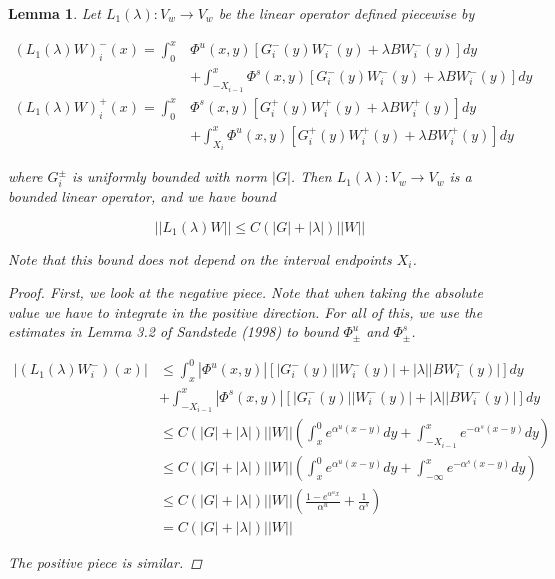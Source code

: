 \documentclass[12pt]{article}
\newtheorem{lemma}{Lemma}
\begin{document}
\begin{lemma}

Let $L_1(\lambda): V_w \rightarrow V_w$ be the linear operator defined piecewise by

\begin{align*}
(L_1(\lambda)W)_i^-(x) = \int_0^x &\Phi^u(x, y)[G_i^-(y) W_i^-(y) + \lambda B W_i^-(y) ] dy \\
&+ \int_{-X_{i-1}}^x \Phi^s(x, y)[G_i^-(y) W_i^-(y) + \lambda B W_i^-(y) ] dy \\
(L_1(\lambda)W)_i^+(x) = \int_0^x &\Phi^s(x, y)[G_i^+(y) W_i^+(y) + \lambda B W_i^+(y)] dy \\
&+ \int_{X_{i}}^x \Phi^u(x, y)[G_i^+(y) W_i^+(y) + \lambda B W_i^+(y) ] dy
\end{align*}

where $G_i^\pm$ is uniformly bounded with norm $|G|$. Then $L_1(\lambda): V_w \rightarrow V_w$ is a bounded linear operator, and we have bound

\begin{equation}
||L_1(\lambda)W|| \leq C\left(|G| +|\lambda|\right)||W||
\end{equation}

Note that this bound does not depend on the interval endpoints $X_i$.

\begin{proof}
First, we look at the negative piece. Note that when taking the absolute value we have to integrate in the positive direction. For all of this, we use the estimates in Lemma 3.2 of Sandstede (1998) to bound $\Phi^u_\pm$ and $\Phi^s_\pm$.

\begin{align*}
|(L_1(\lambda)W_i^-)(x) | &\leq \int_x^0 |\Phi^u(x, y)|[|G_i^-(y)||W_i^-(y)| + |\lambda||B W_i^-(y)| ] dy \\
&+ \int_{-X_{i-1}}^x |\Phi^s(x, y)|[|G_i^-(y)||W_i^-(y)| + |\lambda||B W_i^-(y)| ] dy \\
&\leq C(|G| + |\lambda|) ||W|| \left( \int_x^0 e^{\alpha^u (x-y)} dy + \int_{-X_{i-1}}^x e^{-\alpha^s (x-y)} dy \right) \\
&\leq C(|G| + |\lambda|) ||W|| \left( \int_x^0 e^{\alpha^u (x-y)} dy + \int_{-\infty}^x e^{-\alpha^s (x-y)} dy \right) \\
&\leq C(|G| + |\lambda|) ||W|| \left( \frac{1 - e^{\alpha^u x}}{\alpha^u} + \frac{1}{\alpha^s} \right) \\
&= C (|G| + |\lambda|) ||W|| 
\end{align*}

The positive piece is similar.

\end{proof}
\end{lemma}
\end{document}
